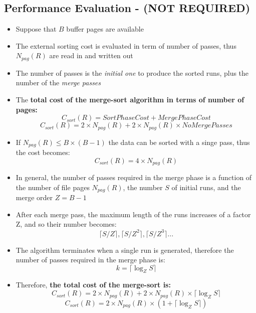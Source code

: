 \subsection{Performance Evaluation - (NOT REQUIRED)}
\begin{itemize}
    \item Suppose that \(B\) buffer pages are available
    \item The external sorting cost is evaluated in term of number of passes, thus \(N_{pag}(R)\) are read in and written out
    \item The number of passes is the \textit{initial one} to produce the sorted runs, plus the number of the \textit{merge passes}
    \item The \textbf{total cost of the merge-sort algorithm in terms of number of pages:}
    \[C_{sort}(R) = SortPhaseCost + MergePhaseCost\]
    \[C_{sort}(R) = 2 \times N_{pag}(R) + 2 \times N_{pag}(R) \times NoMergePasses\]
    \item If \(N_{pag}(R) \leq B \times (B - 1)\) the data can be sorted with a singe pass, thus the cost becomes:
    \[C_{sort}(R) = 4 \times N_{pag}(R)\]
    \item In general, the number of passes required in the merge phase is a function of the number of file pages \(N_{pag}(R)\), the number \(S\) of initial runs, and the merge order \(Z = B -1\)
    \item After each merge pass, the maximum length of the runs increases of a factor Z, and so their number becomes:
    \[\lceil S/Z \rceil, \lceil S/Z^2 \rceil, \lceil S/Z^3 \rceil...\]
    \item The algorithm terminates when a single run is generated, therefore the number of passes required in the merge phase is:
    \[k = \lceil \log_Z S \rceil\]
    \item Therefore, \textbf{the total cost of the merge-sort is:}
    \[C_{sort}(R) = 2 \times N_{pag}(R) + 2 \times N_{pag}(R) \times \lceil \log_Z S \rceil\]
    \[C_{sort}(R) = 2 \times N_{pag}(R) \times (1 + \lceil \log_Z S \rceil)\]
\end{itemize}